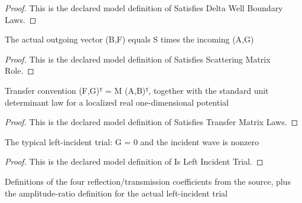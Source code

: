 \begin{proof}
  This is the declared model definition of Satisfies Delta Well Boundary Laws.
\end{proof}
\begin{definition}
  \label{def:physics:phyx-mini-0601:phyxminiproblems-problemphyxmini0601-satisfiesscatteringmatrixrole}
  The actual outgoing vector (B,F) equals S times the incoming (A,G)
\end{definition}
\begin{proof}
  This is the declared model definition of Satisfies Scattering Matrix Role.
\end{proof}
\begin{definition}
  \label{def:physics:phyx-mini-0601:phyxminiproblems-problemphyxmini0601-satisfiestransfermatrixlaws}
  Transfer convention (F,G)ᵀ = M (A,B)ᵀ, together with the standard unit determinant law for a localized real one-dimensional potential
\end{definition}
\begin{proof}
  This is the declared model definition of Satisfies Transfer Matrix Laws.
\end{proof}
\begin{definition}
  \label{def:physics:phyx-mini-0601:phyxminiproblems-problemphyxmini0601-isleftincidenttrial}
  The typical left-incident trial: G = 0 and the incident wave is nonzero
\end{definition}
\begin{proof}
  This is the declared model definition of Is Left Incident Trial.
\end{proof}
\begin{definition}
  \label{def:physics:phyx-mini-0601:phyxminiproblems-problemphyxmini0601-satisfiesscatteringobservables}
  Definitions of the four reflection/transmission coefficients from the source, plus the amplitude-ratio definition for the actual left-incident trial
\end{definition}
